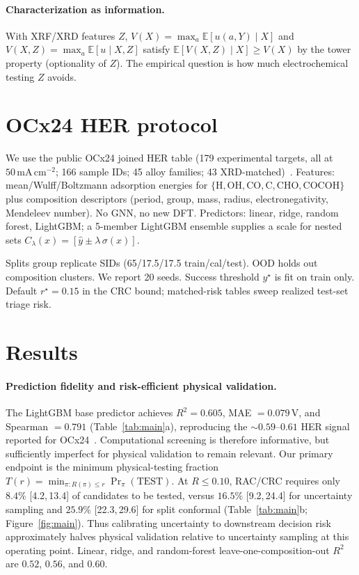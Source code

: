 \documentclass[10pt,twocolumn]{article}
\begin{document}
\paragraph{Characterization as information.}
With XRF/XRD features \(Z\), \(V(X)=\max_a\mathbb{E}[u(a,Y)\mid X]\) and \(V(X,Z)=\max_a\mathbb{E}[u\mid X,Z]\) satisfy \(\mathbb{E}[V(X,Z)\mid X]\ge V(X)\) by the tower property (optionality of \(Z\)). The empirical question is how much electrochemical testing \(Z\) avoids.

\vspace{-0.4em}
\section{OCx24 HER protocol}
\vspace{-0.3em}
We use the public OCx24 joined HER table (179 experimental targets, all at \(50\,\mathrm{mA\,cm^{-2}}\); 166 sample IDs; 45 alloy families; 43 XRD-matched)~\citep{abed2024ocx24}. Features: mean/Wulff/Boltzmann adsorption energies for \(\{\mathrm{H},\mathrm{OH},\mathrm{CO},\mathrm{C},\mathrm{CHO},\mathrm{COCOH}\}\) plus composition descriptors (period, group, mass, radius, electronegativity, Mendeleev number). No GNN, no new DFT. Predictors: linear, ridge, random forest, LightGBM; a 5-member LightGBM ensemble supplies a scale for nested sets \(C_\lambda(x)=[\hat y\pm\lambda\,\sigma(x)]\).

Splits group replicate SIDs (65/17.5/17.5 train/cal/test). OOD holds out composition clusters. We report 20 seeds. Success threshold \(y^\star\) is fit on train only. Default \(r^\star{=}0.15\) in the CRC bound; matched-risk tables sweep realized test-set triage risk.

\vspace{-0.4em}
\section{Results}
\vspace{-0.3em}
\paragraph{Prediction fidelity and risk-efficient physical validation.}
The LightGBM base predictor achieves $R^2{=}0.605$, MAE ${=}0.079\,\mathrm{V}$, and Spearman ${=}0.791$ (Table~\ref{tab:main}a), reproducing the ${\sim}0.59$--$0.61$ HER signal reported for OCx24~\citep{abed2024ocx24}. Computational screening is therefore informative, but sufficiently imperfect for physical validation to remain relevant. Our primary endpoint is the minimum physical-testing fraction $T(r)=\min_{\pi:R(\pi)\le r}\Pr_\pi(\mathrm{TEST})$. At $R\le 0.10$, RAC/CRC requires only $8.4\%$ {[4.2,\,13.4]} of candidates to be tested, versus $16.5\%$ {[9.2,\,24.4]} for uncertainty sampling and $25.9\%$ {[22.3,\,29.6]} for split conformal (Table~\ref{tab:main}b; Figure~\ref{fig:main}). Thus calibrating uncertainty to downstream decision risk approximately halves physical validation relative to uncertainty sampling at this operating point. Linear, ridge, and random-forest leave-one-composition-out $R^2$ are $0.52$, $0.56$, and $0.60$.
\end{document}
